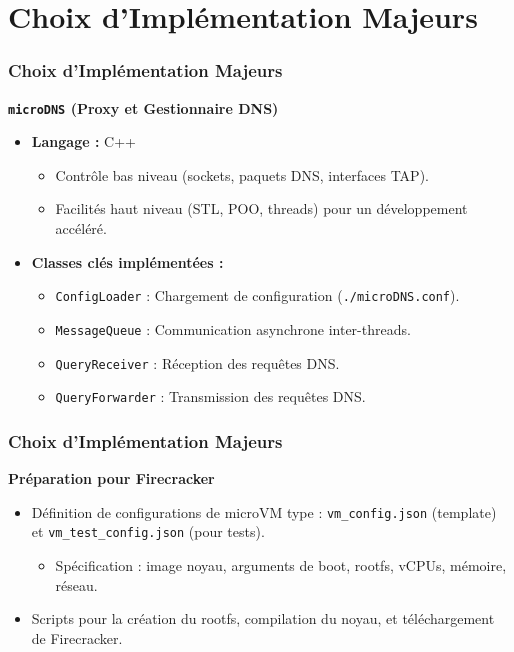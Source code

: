 \documentclass[12pt]{beamer}
\begin{document}
    \section{Choix d'Implémentation Majeurs}
	\begin{frame}
		\frametitle{Choix d'Implémentation Majeurs}
		\textbf{\texttt{microDNS} (Proxy et Gestionnaire DNS)}
		\begin{itemize}
			\item \textbf{Langage :} C++
			\begin{itemize}
				\item Contrôle bas niveau (sockets, paquets DNS, interfaces TAP).
				\item Facilités haut niveau (STL, POO, threads) pour un développement accéléré.
			\end{itemize}
			\item \textbf{Classes clés implémentées :}
			\begin{itemize}
				\item \texttt{ConfigLoader} : Chargement de configuration (\texttt{./microDNS.conf}).
				\item \texttt{MessageQueue} : Communication asynchrone inter-threads.
				\item \texttt{QueryReceiver} : Réception des requêtes DNS.
				\item \texttt{QueryForwarder} : Transmission des requêtes DNS.
			\end{itemize}
		\end{itemize}
	\end{frame}

	\begin{frame}
		\frametitle{Choix d'Implémentation Majeurs}
		\textbf{Préparation pour Firecracker}
		\begin{itemize}
			\item Définition de configurations de microVM type : \texttt{vm\_config.json} (template) et \texttt{vm\_test\_config.json} (pour tests).
			\begin{itemize}
				\item Spécification : image noyau, arguments de boot, rootfs, vCPUs, mémoire, réseau.
			\end{itemize}
			\item Scripts pour la création du rootfs, compilation du noyau, et téléchargement de Firecracker.
		\end{itemize}
	\end{frame}

\end{document}
